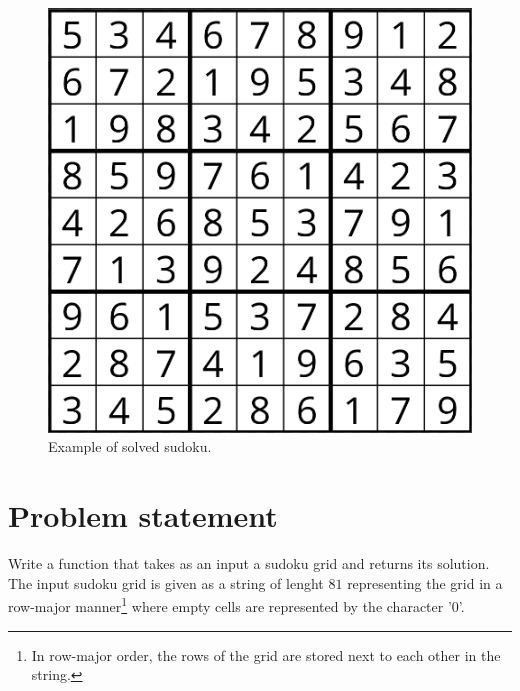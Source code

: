 \begin{figure}
	\label{fig:sudoku:example}
	\centering
	\includegraphics[width=\textwidth]{sources/sudoku/images/sudoku-example}
	\caption{Example of solved sudoku.}
\end{figure}

\section{Problem statement}
\begin{exercise}
Write a function that takes as an input a sudoku grid and returns its solution. The input sudoku
grid is given as a string of lenght $81$ representing the grid in a row-major manner\footnote{In
row-major order, the rows of the grid are stored next to each other in the string.} where empty
cells are represented by the character '0'.
\end{exercise}


